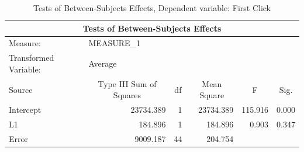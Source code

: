 \documentclass[a4paper]{article}
\begin{document}
\begin{table}[H]
\centering
\caption{Tests of Between-Subjects Effects, Dependent variable: First Click}
\label{tab:betweenfirstclick}
\begin{tabular}{|l|r|r|r|l|l|} 
\hline
\multicolumn{6}{|c|}{Tests of Between-Subjects Effects}                                                                                                                                         \\ 
\hline
Measure:~              & \multicolumn{1}{l|}{MEASURE\_1}              & \multicolumn{1}{l|}{}   & \multicolumn{1}{l|}{}            &                              &                             \\ 
\hline
Transformed Variable:~ & \multicolumn{1}{l|}{Average}                 & \multicolumn{1}{l|}{}   & \multicolumn{1}{l|}{}            &                              &                             \\ 
\hline
Source                 & \multicolumn{1}{c|}{Type III Sum of Squares} & \multicolumn{1}{c|}{df} & \multicolumn{1}{c|}{Mean Square} & \multicolumn{1}{c|}{F}       & \multicolumn{1}{c|}{Sig.}   \\ 
\hline
Intercept              & 23734.389                                    & 1                       & 23734.389                        & \multicolumn{1}{r|}{115.916} & \multicolumn{1}{r|}{0.000}  \\ 
\hline
L1                     & 184.896                                      & 1                       & 184.896                          & \multicolumn{1}{r|}{0.903}   & \multicolumn{1}{r|}{0.347}  \\ 
\hline
Error                  & 9009.187                                     & 44                      & 204.754                          & ~                            & ~                           \\
\hline
\end{tabular}
\end{table}

\end{document}

